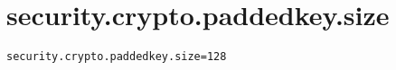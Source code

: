 \section{security.crypto.paddedkey.size}
\label{configuration:SecurityCryptoPaddedkeySize}
\AvailableInJavaOnly{\TODO}
\begin{lstlisting}[style=Props,caption={Usage example for \textit{security.crypto.paddedkey.size}}]
security.crypto.paddedkey.size=128
\end{lstlisting}
